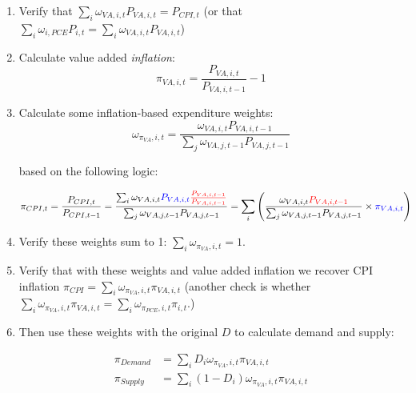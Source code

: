 \documentclass[12pt,english]{article}
\begin{document}
\begin{enumerate}
	\item Verify that $\sum_i \omega_{VA,i,t} P_{VA,i,t} = P_{CPI,t}$ (or that $\sum_i \omega_{i,PCE} P_{i,t} = \sum_i \omega_{VA,i,t} P_{VA,i,t}$)
	\item Calculate value added \emph{inflation}: 
	\[
		\pi_{VA,i,t} = \frac{P_{VA,i,t}}{P_{VA,i,t-1}}-1
	\]
	\item Calculate some inflation-based expenditure weights:
	\[
		\omega_{\pi_{VA},i,t} = \frac{\omega_{VA,i,t}P_{VA,i,t-1}}{\sum_j \omega_{VA,j,t-1}P_{VA,j,t-1}}
	\]
	
	based on the following logic:
	
	\begin{align*}
		\pi_{CPI,t} &=\frac{P_{CPI,t}}{P_{CPI,t-1}} = \frac{\sum_i \omega_{VA,i,t} \textcolor{blue}{P_{VA, i,t}}\textcolor{red}{\frac{P_{VA, i,t-1}}{P_{VA, i,t-1}}}}{\sum_j \omega_{VA,j,t-1} P_{VA, j,t-1}} = \sum_i \left(\frac{\omega_{VA,i,t}\textcolor{red}{P_{VA,i,t-1}}}{\sum_j \omega_{VA,j,t-1} P_{VA, j,t-1}} \times \textcolor{blue}{\pi_{VA,i,t}}\right)
	\end{align*}	
	
	\item Verify these weights sum to 1: $\sum_i \omega_{\pi_{VA},i,t}=1$.
	\item Verify that with these weights and value added inflation we recover CPI inflation $\pi_{CPI} = \sum_i \omega_{\pi_{VA},i,t} \pi_{VA,i,t}$ (another check is whether $\sum_i \omega_{\pi_{VA},i,t} \pi_{VA,i,t} = \sum_i \omega_{\pi_{PCE},i,t} \pi_{i,t}$.)
	\item Then use these weights with the original $D$ to calculate demand and supply:
	
	\begin{align*}
		\pi_{Demand} &= \sum_i D_i \omega_{\pi_{VA},i,t} \pi_{VA,i,t}\\
		\pi_{Supply} &= \sum_i (1-D_i) \omega_{\pi_{VA},i,t} \pi_{VA,i,t}\\
	\end{align*}
\end{enumerate}
\end{document}
